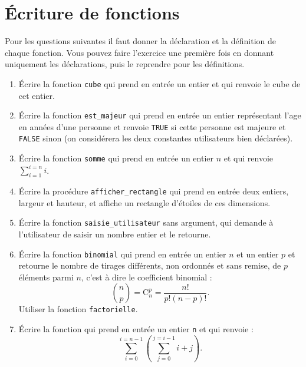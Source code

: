 \section{Écriture de fonctions}

Pour les questions suivantes il faut donner la déclaration et la
définition de chaque fonction. Vous pouvez faire l'exercice une
première fois en donnant uniquement les déclarations, puis le
reprendre pour les définitions.
\begin{enumerate}
\item Écrire la fonction \verb|cube| qui prend en entrée un entier et qui renvoie le cube de cet entier.
\item Écrire la fonction \verb|est_majeur| qui prend en entrée un entier représentant l'age en années d'une personne et renvoie \verb|TRUE| si cette personne est majeure et \verb|FALSE| sinon (on considérera les deux constantes utilisateurs bien déclarées).
\item Écrire la fonction \verb|somme| qui prend en entrée un entier
  $n$ et qui renvoie $\sum_{i=1}^{i=n} i$.
\item Écrire la procédure \verb|afficher_rectangle| qui prend en
  entrée deux entiers, largeur et hauteur, et affiche un rectangle
  d'étoiles de ces dimensions.
\item Écrire la fonction \verb|saisie_utilisateur| sans argument, qui demande à l'utilisateur de saisir un nombre entier et le
  retourne. 
\item Écrire la fonction \verb|binomial| qui prend en entrée un entier
  $n$ et un entier $p$ et retourne le nombre de tirages différents,
  non ordonnés et sans remise, de $p$ éléments parmi $n$, c'est à dire
  le coefficient binomial :
\[
\binom{n}{p} = \text{C}^p_n = \frac{n!}{p!(n-p)!}.
\]
Utiliser la fonction \verb|factorielle|.
\item Écrire la fonction qui prend en entrée un entier \verb|n| et qui
  renvoie : \[\sum_{i=0}^{i=n-1} (\sum_{j=0}^{j=i-1}i+j).\]
\end{enumerate}

